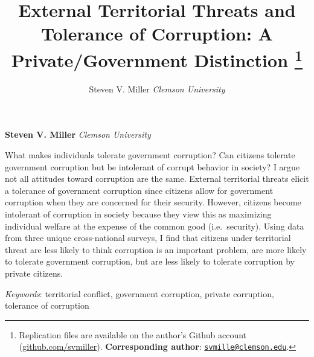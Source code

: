 \documentclass[11pt,]{article}
\title{External Territorial Threats and Tolerance of Corruption: A
Private/Government Distinction \thanks{Replication files are available on the author's Github account
(\href{https://github.com/svmiller}{github.com/svmiller}).
\textbf{Corresponding author}:
\href{mailto:svmille@clemson.edu}{\nolinkurl{svmille@clemson.edu}}.}  }
\author{\Large Steven V. Miller\vspace{0.05in} \newline\normalsize\emph{Clemson University}  }
\date{}
\newcommand*{\authorfont}{\fontfamily{phv}\selectfont}
\renewenvironment{abstract}
 {{%
    \setlength{\leftmargin}{0mm}
    \setlength{\rightmargin}{\leftmargin}%
  }%
  \relax}
 {\endlist}
\begin{document}
	
%

{%
\setlength{\parindent}{0pt}
\thispagestyle{plain}
{\fontsize{18}{20}\selectfont\raggedright 
\maketitle  %

}

{
   \vskip 13.5pt\relax \normalsize\fontsize{11}{12} 
\textbf{\authorfont Steven V. Miller} \hskip 15pt \emph{\small Clemson University}   

}

}








\begin{abstract}

    \hbox{\vrule height .2pt width 39.14pc}

    \vskip 8.5pt %

\noindent What makes individuals tolerate government corruption? Can citizens
tolerate government corruption but be intolerant of corrupt behavior in
society? I argue not all attitudes toward corruption are the same.
External territorial threats elicit a tolerance of government corruption
since citizens allow for government corruption when they are concerned
for their security. However, citizens become intolerant of corruption in
society because they view this as maximizing individual welfare at the
expense of the common good (i.e.~security). Using data from three unique
cross-national surveys, I find that citizens under territorial threat
are less likely to think corruption is an important problem, are more
likely to tolerate government corruption, but are less likely to
tolerate corruption by private citizens.


\vskip 8.5pt \noindent \emph{Keywords}: territorial conflict, government corruption, private corruption,
tolerance of corruption \par

    \hbox{\vrule height .2pt width 39.14pc}



\end{abstract}
\end{document}
